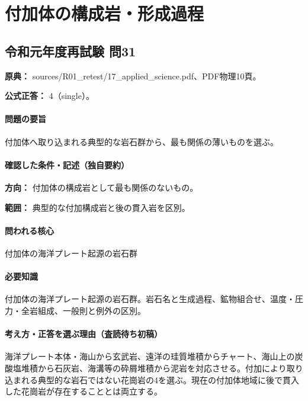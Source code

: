 \section{付加体の構成岩・形成過程}

\subsection{令和元年度再試験 問31}
\label{q:r01-ret-applied-31}

\noindent\textbf{原典：} sources/R01\_retest/17\_applied\_science.pdf、PDF物理10頁。

\textbf{公式正答：} 4（single）。

\paragraph{問題の要旨} 付加体へ取り込まれる典型的な岩石群から、最も関係の薄いものを選ぶ。

\paragraph{確認した条件・記述（独自要約）}\mbox{}\par

\noindent\textbf{方向：} 付加体の構成岩として最も関係のないもの。\par

\noindent\textbf{範囲：} 典型的な付加構成岩と後の貫入岩を区別。\par

\paragraph{問われる核心} 付加体の海洋プレート起源の岩石群

\paragraph{必要知識} 付加体の海洋プレート起源の岩石群。岩石名と生成過程、鉱物組合せ、温度・圧力・全岩組成、一般則と例外の区別。

\paragraph{考え方・正答を選ぶ理由（査読待ち初稿）} 海洋プレート本体・海山から玄武岩、遠洋の珪質堆積からチャート、海山上の炭酸塩堆積から石灰岩、海溝等の砕屑堆積から泥岩を対応させる。付加により取り込まれる典型的な岩石ではない花崗岩の4を選ぶ。現在の付加体地域に後で貫入した花崗岩が存在することとは両立する。

